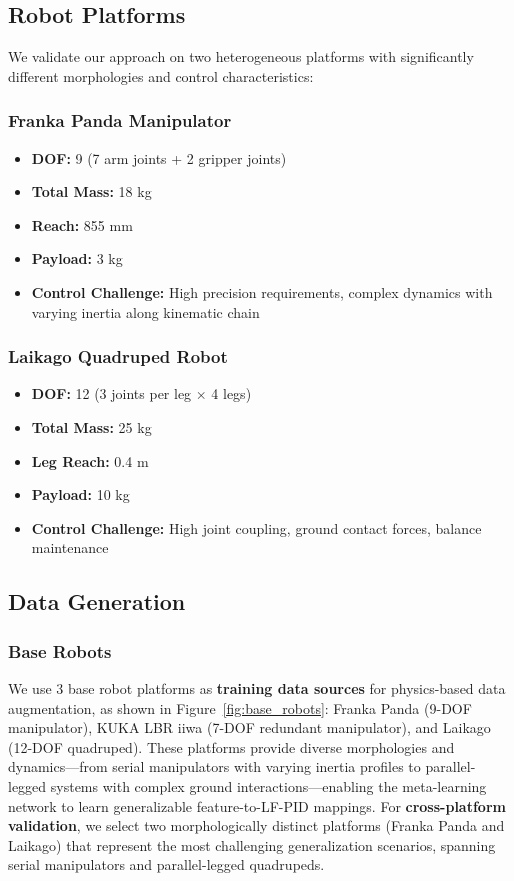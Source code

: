 \documentclass[a4paper]{cas-sc}
\begin{document}
\subsection{Robot Platforms}

We validate our approach on two heterogeneous platforms with significantly different morphologies and control characteristics:

\subsubsection{Franka Panda Manipulator}
\begin{itemize}
    \item \textbf{DOF:} 9 (7 arm joints + 2 gripper joints)
    \item \textbf{Total Mass:} 18 kg
    \item \textbf{Reach:} 855 mm
    \item \textbf{Payload:} 3 kg
    \item \textbf{Control Challenge:} High precision requirements, complex dynamics with varying inertia along kinematic chain
\end{itemize}

\subsubsection{Laikago Quadruped Robot}
\begin{itemize}
    \item \textbf{DOF:} 12 (3 joints per leg $\times$ 4 legs)
    \item \textbf{Total Mass:} 25 kg
    \item \textbf{Leg Reach:} 0.4 m
    \item \textbf{Payload:} 10 kg
    \item \textbf{Control Challenge:} High joint coupling, ground contact forces, balance maintenance
\end{itemize}

\subsection{Data Generation}

\subsubsection{Base Robots}

We use 3 base robot platforms as \textbf{training data sources} for physics-based data augmentation, as shown in Figure~\ref{fig:base_robots}: Franka Panda (9-DOF manipulator), KUKA LBR iiwa (7-DOF redundant manipulator), and Laikago (12-DOF quadruped). These platforms provide diverse morphologies and dynamics—from serial manipulators with varying inertia profiles to parallel-legged systems with complex ground interactions—enabling the meta-learning network to learn generalizable feature-to-LF-PID mappings. For \textbf{cross-platform validation}, we select two morphologically distinct platforms (Franka Panda and Laikago) that represent the most challenging generalization scenarios, spanning serial manipulators and parallel-legged quadrupeds.
\end{document}
